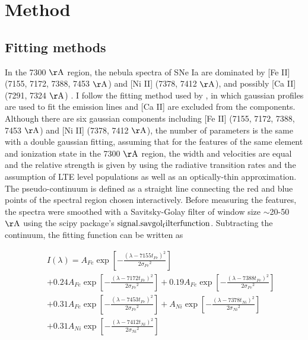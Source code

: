 \documentclass[twocolumn]{aastex631}
\begin{document}
\section{Method} \label{sec:method}

\subsection{Fitting methods \label{subsec:fitting}}

In the 7300 $\rm \AA$ region, the nebula spectra of SNe Ia are dominated by [Fe II] (7155, 7172, 7388, 7453 $\rm \AA$) and [Ni II] (7378, 7412 $\rm \AA$), and possibly [Ca II] (7291, 7324 $\rm \AA$) \citep{2018MNRAS.477.3567M}. I follow the fitting method used by \citet{2018MNRAS.477.3567M}, in which gaussian profiles are used to fit the emission lines and [Ca II] are excluded from the components. Although there are six gaussian components including [Fe II] (7155, 7172, 7388, 7453 $\rm \AA$) and [Ni II] (7378, 7412 $\rm \AA$), the number of parameters is the same with a double gaussian fitting, assuming that for the features of the same element and ionization state in the 7300 $\rm \AA$ region, the width and velocities are equal and the relative strength is given by \citet{2015A&A...573A..12J} using the radiative transition rates and the assumption of LTE level populations as well as an optically-thin approximation. The pseudo-continuum is defined as a straight line connecting the red and blue points of the spectral region chosen interactively. Before measuring the features, the spectra were smoothed with a Savitsky-Golay filter of window size $\sim$20-50 $\rm \AA$ using the scipy package’s $\rm signal.savgol_filter function$. Subtracting the continuum, the fitting function can be written as
\begin{small}
\begin{eqnarray}
 \nonumber
&&I\left(\lambda\right)=A_{Fe}\exp{\left[-\frac{\left(\lambda-7155t_{Fe}\right)^2}{2{\sigma_{Fe}}^2}\right]}\\  \nonumber
&&+0.24A_{Fe}\exp{\left[-\frac{\left(\lambda-7172t_{Fe}\right)^2}{2{\sigma_{Fe}}^2}\right]}
+{0.19A}_{Fe}\exp{\left[-\frac{\left(\lambda-7388t_{Fe}\right)^2}{2{\sigma_{Fe}}^2}\right]}\\  \nonumber
&&+{0.31A}_{Fe}\exp{\left[-\frac{\left(\lambda-7453t_{Fe}\right)^2}{2{\sigma_{Fe}}^2}\right]}
+A_{Ni}\exp{\left[-\frac{\left(\lambda-7378t_{Ni}\right)^2}{2{\sigma_{Ni}}^2}\right]}\\ 
&&+0.31A_{Ni}\exp{\left[-\frac{\left(\lambda-7412t_{Ni}\right)^2}{2{\sigma_{Ni}}^2}\right]}
\end{eqnarray}
\end{small}
\end{document}
